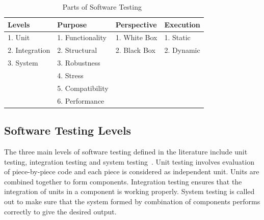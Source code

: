 \begin{table}[ht]
\caption{Parts of Software Testing~\cite{adrion1982validation, chilenski1994applicability, gaudel2010software, richardson1992specification, tracey1998automated}} %
\smallskip
\centering %
\begin{tabular}{| l | l | l | l | } %
\hline

Levels 					&Purpose		 				& Perspective			& Execution 	\\
\hline
1. Unit					&1. Functionality		& 1. White Box		& 1. Static 	\\
2. Integration	&2. Structural			& 2. Black Box		& 2. Dynamic	\\
3. System				&3. Robustness			& 								&			\\
								&4. Stress					&									&			\\
								&5. Compatibility		&									&			\\
								&6. Performance			&									&			\\



\hline %
\end{tabular}
\bigskip
\label{table:addvalues} %
\end{table}


\subsection{Software Testing Levels}
The three main levels of software testing defined in the literature include unit testing, integration testing and system testing~\cite{chilenski1994applicability}. Unit testing involves evaluation of piece-by-piece code and each piece is considered as independent unit. Units are combined together to form components. Integration testing ensures that the integration of units in a component is working properly. System testing is called out to make sure that the system formed by combination of components performs correctly to give the desired output.


